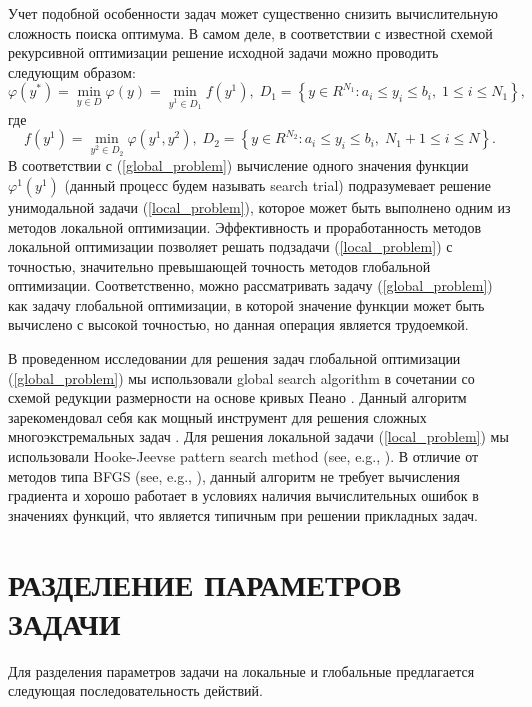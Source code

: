 \documentclass{aip-cp}
\begin{document}
Учет подобной особенности задач может существенно снизить вычислительную сложность поиска оптимума. В самом деле, в соответствии с известной схемой рекурсивной оптимизации \cite{Carr} решение исходной задачи можно проводить следующим образом:
\begin{equation}\label{global_problem}
\varphi(y^*) = \min_{y\in D} \varphi (y) = \min_{y^1\in D_1} f(y^1), \; D_1=\left\{y\in R^{N_1}: a_i\leq y_i \leq b_i, \; 1\leq i \leq N_1\right\},
\end{equation}
где 
\begin{equation}\label{local_problem}
f(y^1) = \min_{ y^2 \in D_2} \varphi(y^1,y^2), \; D_2=\left\{y\in R^{N_2}: a_i\leq y_i \leq b_i, \; N_1+1\leq i \leq N\right\}.
\end{equation}
В соответствии с (\ref{global_problem}) вычисление одного значения функции $\varphi^1 (y^1)$ (данный процесс будем называть search trial) подразумевает решение унимодальной задачи (\ref{local_problem}), которое может быть выполнено одним из методов локальной оптимизации. Эффективность и проработанность методов локальной оптимизации позволяет решать подзадачи (\ref{local_problem}) с точностью, значительно превышающей точность методов глобальной оптимизации. Соответственно, можно рассматривать задачу (\ref{global_problem}) как задачу глобальной оптимизации, в которой значение функции может быть вычислено с высокой точностью, но данная операция является трудоемкой. 

В проведенном исследовании для решения задач глобальной оптимизации (\ref{global_problem}) мы использовали global search algorithm в сочетании со схемой редукции размерности на основе кривых Пеано \cite{Sergeyev2013,Lera2021}. Данный алгоритм зарекомендовал себя как мощный инструмент для решения сложных многоэкстремальных задач \cite{Kvasov2013,Kalyulin2017,Cavoretto2021}.
Для решения локальной задачи (\ref{local_problem}) мы использовали Hooke-Jeevse pattern search method (see, e.g., \cite{Kelley}). В отличие от методов типа BFGS (see, e.g., \cite{Nocedal}), данный алгоритм не требует вычисления градиента и хорошо работает в условиях наличия вычислительных ошибок в значениях функций, что является типичным при решении прикладных задач.

\section{РАЗДЕЛЕНИЕ ПАРАМЕТРОВ ЗАДАЧИ}

Для разделения параметров задачи на локальные и глобальные предлагается следующая последовательность действий.
\end{document}
